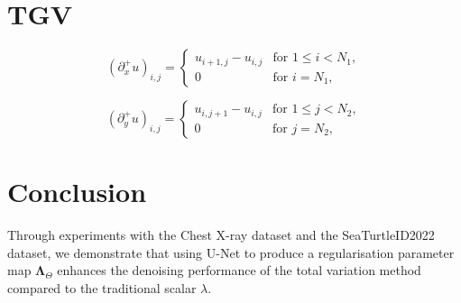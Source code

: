 \documentclass[12pt]{article}
\begin{document}



\section{TGV}


\begin{equation}
    (\partial_x^+ u)_{i,j} =
    \begin{cases}
    u_{i+1,j} - u_{i,j} & \text{for } 1 \leq i < N_1, \\
    0 & \text{for } i = N_1,
    \end{cases}
\end{equation}
    
\begin{equation}
    (\partial_y^+ u)_{i,j} =
    \begin{cases}
    u_{i,j+1} - u_{i,j} & \text{for } 1 \leq j < N_2, \\
    0 & \text{for } j = N_2,
    \end{cases}
\end{equation}


\section{Conclusion}


Through experiments with the Chest X-ray dataset and the SeaTurtleID2022 dataset, we demonstrate that using U-Net to produce a regularisation parameter map $\mathbf{\Lambda}_{\Theta}$ enhances the denoising performance of the total variation method compared to the traditional scalar $\lambda$.
\end{document}

